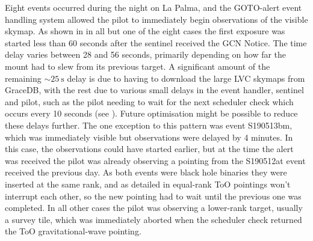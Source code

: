 \begin{colsection}
\begin{colsection}
Eight events occurred during the night on La Palma, and the GOTO-alert event handling system allowed the pilot to immediately begin observations of the visible skymap. As shown in  in all but one of the eight cases the first exposure was started less than 60 seconds after the sentinel received the GCN Notice. The time delay varies between 28 and 56 seconds, primarily depending on how far the mount had to slew from its previous target. A significant amount of the remaining $\sim\SI{25}{\second}$ delay is due to having to download the large LVC skymaps from GraceDB, with the rest due to various small delays in the event handler, sentinel and pilot, such as the pilot needing to wait for the next scheduler check which occurs every 10 seconds
(see ).
Future optimisation might be possible to reduce these delays further. The one exception to this pattern was event S190513bm, which was immediately visible but observations were delayed by 4 minutes. In this case, the observations could have started earlier, but at the time the alert was received the pilot was already observing a pointing from the S190512at event received the previous day. As both events were black hole binaries they were inserted at the same rank, and as detailed in
equal-rank ToO pointings won't interrupt each other, so the new pointing had to wait until the previous one was completed. In all other cases the pilot was observing a lower-rank target, usually a survey tile, which was immediately aborted when the scheduler check returned the ToO gravitational-wave pointing.


\end{colsection}
\end{colsection}
